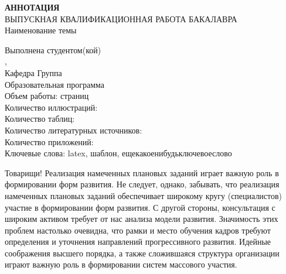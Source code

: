 \thispagestyle{empty}
\newpage
\setcounter{page}{2}

\begin{center}
	\textbf{АННОТАЦИЯ} \\
	\vspace{5mm}
	ВЫПУСКНАЯ КВАЛИФИКАЦИОННАЯ РАБОТА БАКАЛАВРА \\
	Наименование темы \uline{\topic\hfill} \\
	\hrulefill
\end{center}

\begin{flushleft}
	Выполнена студентом(кой) \uline{\studentformedname\hfill} \\
	\faculty, \university \\
	Кафедра \uline{\department\hfill} Группа \uline{\group} \\
	Образовательная программа \programnum\thinspace\programname \\
	\vspace{5mm}
	Объем работы:  страниц \\
	Количество иллюстраций: \totalfigures \\
	Количество таблиц: \totaltables \\
	Количество литературных источников:  \\
	Количество приложений:  \\
	Ключевые слова: latex, шаблон, ещекакоенибудьключевоеслово
\end{flushleft}


Товарищи! Реализация намеченных плановых заданий играет важную роль в формировании форм развития. Не следует, однако, забывать, что реализация намеченных плановых заданий обеспечивает широкому кругу (специалистов) участие в формировании форм развития. С другой стороны, консультация с широким активом требует от нас анализа модели развития. Значимость этих проблем настолько очевидна, что рамки и место обучения кадров требуют определения и уточнения направлений прогрессивного развития. Идейные соображения высшего порядка, а также сложившаяся структура организации играют важную роль в формировании систем массового участия.

